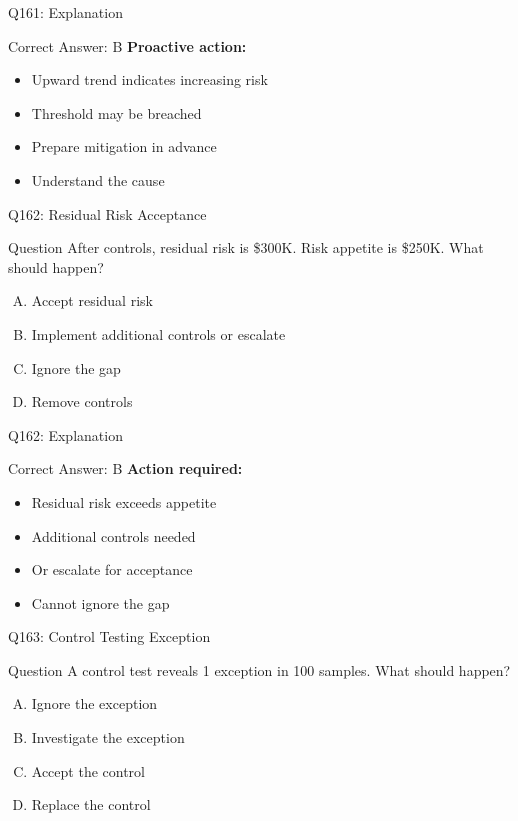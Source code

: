 \documentclass{beamer}
\begin{document}
	\begin{frame}{Q161: Explanation}
		\begin{block}{Correct Answer: B}
			\textbf{Proactive action:}
			\begin{itemize}
				\item Upward trend indicates increasing risk
				\item Threshold may be breached
				\item Prepare mitigation in advance
				\item Understand the cause
			\end{itemize}
		\end{block}
	\end{frame}
	
	\begin{frame}{Q162: Residual Risk Acceptance}
		\begin{block}{Question}
			After controls, residual risk is \$300K. Risk appetite is \$250K. What should happen?
		\end{block}
		\begin{enumerate}[(A)]
			\item Accept residual risk
			\item Implement additional controls or escalate
			\item Ignore the gap
			\item Remove controls
		\end{enumerate}
	\end{frame}
	
	\begin{frame}{Q162: Explanation}
		\begin{block}{Correct Answer: B}
			\textbf{Action required:}
			\begin{itemize}
				\item Residual risk exceeds appetite
				\item Additional controls needed
				\item Or escalate for acceptance
				\item Cannot ignore the gap
			\end{itemize}
		\end{block}
	\end{frame}
	
	\begin{frame}{Q163: Control Testing Exception}
		\begin{block}{Question}
			A control test reveals 1 exception in 100 samples. What should happen?
		\end{block}
		\begin{enumerate}[(A)]
			\item Ignore the exception
			\item Investigate the exception
			\item Accept the control
			\item Replace the control
		\end{enumerate}
	\end{frame}
	
\end{document}
